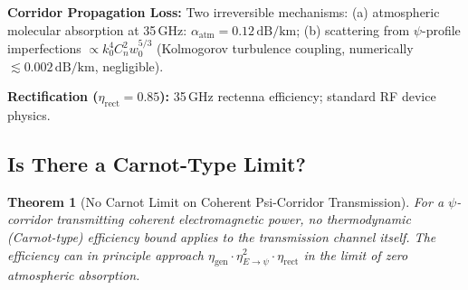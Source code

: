 \documentclass[aps,prd,twocolumn,superscriptaddress]{revtex4-2}
\newtheorem{theorem}{Theorem}
\begin{document}
\textbf{Corridor Propagation Loss:}
Two irreversible mechanisms: (a) atmospheric molecular absorption
at 35\,GHz: $\alpha_\mathrm{atm} = 0.12\,\mathrm{dB/km}$;
(b) scattering from $\psi$-profile imperfections
$\propto k_0^4 C_n^2 w_0^{5/3}$ (Kolmogorov turbulence coupling,
numerically $\lesssim 0.002\,\mathrm{dB/km}$, negligible).

\textbf{Rectification ($\eta_\mathrm{rect} = 0.85$):}
35\,GHz rectenna efficiency; standard RF device physics.

\subsection{Is There a Carnot-Type Limit?}

\begin{theorem}[No Carnot Limit on Coherent Psi-Corridor Transmission]
For a $\psi$-corridor transmitting coherent electromagnetic power,
no thermodynamic (Carnot-type) efficiency bound applies to the
transmission channel itself.  The efficiency can in principle approach
$\eta_\mathrm{gen}\cdot\eta_{E\to\psi}^2\cdot\eta_\mathrm{rect}$
in the limit of zero atmospheric absorption.
\end{theorem}
\end{document}
